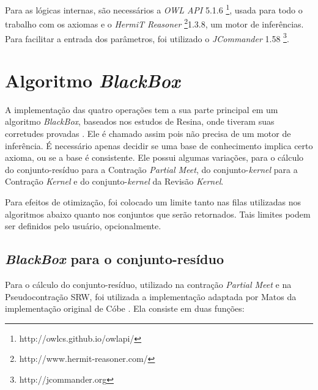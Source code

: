 Para as lógicas internas, são necessários a \textit{OWL API} 5.1.6 \footnote{http://owlcs.github.io/owlapi/}, usada para todo o trabalho com os axiomas e o \textit{HermiT Reasoner} \footnote{http://www.hermit-reasoner.com/}1.3.8, um motor de inferências. Para facilitar a entrada dos parâmetros, foi utilizado o \textit{JCommander} 1.58 \footnote{http://jcommander.org}.

\section{Algoritmo \textit{BlackBox}}

A implementação das quatro operações tem a sua parte principal em um algoritmo \textit{BlackBox}, baseados nos estudos de Resina, onde tiveram suas corretudes provadas \citep{logicaResina}. Ele é chamado assim pois não precisa de um motor de inferência. É necessário apenas decidir se uma base de conhecimento implica certo axioma, ou se a base é consistente. Ele possui algumas variações, para o cálculo do conjunto-resíduo para a Contração \textit{Partial Meet}, do conjunto-\textit{kernel} para a Contração \textit{Kernel} e do conjunto-\textit{kernel} da Revisão \textit{Kernel}.

Para efeitos de otimização, foi colocado um limite tanto nas filas utilizadas nos algoritmos abaixo quanto nos conjuntos que serão retornados. Tais limites podem ser definidos pelo usuário, opcionalmente.

\subsection{\textit{BlackBox} para o conjunto-resíduo}

Para o cálculo do conjunto-resíduo, utilizado na contração \textit{Partial Meet} e na Pseudocontração SRW, foi utilizada a implementação adaptada por Matos da implementação original de Cóbe \citep{logicaMatos}. Ela consiste em duas funções:

